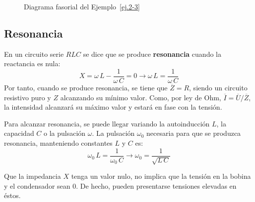 \begin{example}
\begin{figure}[H]
			\caption{Diagrama fasorial del Ejemplo~\ref{ej.2-3}}
			\label{fig.diagrama_fasorial_ejemplo2-3}
		\end{figure}
		
	\end{example}
	
	\subsection{Resonancia}\label{sec.resonancia_serie}
	
	En un circuito serie $RLC$ se dice que se produce \textbf{resonancia} cuando la reactancia es nula:
	\begin{equation*}
		X=\omega\,L-\dfrac{1}{\omega\,C}=0\rightarrow \omega\,L=\dfrac{1}{\omega\,C}
	\end{equation*}
	Por tanto, cuando se produce resonancia, se tiene que $\overline{Z}=R$, siendo un circuito resistivo puro y $Z$ alcanzando su mínimo valor. Como, por ley de Ohm, $\overline{I}=\overline{U}/\overline{Z}$, la intensidad alcanzará su máximo valor y estará en fase con la tensión. 
	
	Para alcanzar resonancia, se puede llegar variando la autoinducción $L$, la capacidad $C$ o la pulsación $\omega$. La pulsación $\omega_0$ necesaria para que se produzca resonancia, manteniendo constantes $L$ y $C$ es:
	\begin{equation}
		\omega_0\,L=\dfrac{1}{\omega_0\,C}\rightarrow \boxed{\omega_0=\dfrac{1}{\sqrt{L\,C}}}
	\end{equation}
	\begin{remark}
		Que la impedancia $X$ tenga un valor nulo, no implica que la tensión en la bobina y el condensador sean 0. De hecho, pueden presentarse tensiones elevadas en éstos.
	\end{remark}
	
